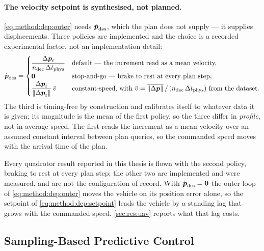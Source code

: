 \paragraph{The velocity setpoint is synthesised, not planned.} \eqref{eq:method:dep:outer} needs
$\dot{\boldsymbol{p}}_{\textrm{des}}$, which the plan does not supply --- it supplies displacements. Three
policies are implemented and the choice is a recorded experimental factor, not an implementation
detail:
\begin{equation}\label{eq:method:dep:vdes}
  \dot{\boldsymbol{p}}_{\textrm{des}} =
  \begin{cases}
    \dfrac{\Delta\boldsymbol{p}_{t}}{n_{\textrm{dec}}\,\Delta t_{\textrm{phys}}} & \text{default --- the increment read as a mean velocity,}\\
    \boldsymbol{0} & \text{stop-and-go --- brake to rest at every plan step,}\\
    \dfrac{\Delta\boldsymbol{p}_{t}}{\|\Delta\boldsymbol{p}_{t}\|}\,\bar{v} & \text{constant-speed, with }
      \bar{v} = \overline{\|\Delta\boldsymbol{p}\|}\,/\,(n_{\textrm{dec}}\,\Delta t_{\textrm{phys}})\text{ from the dataset.}
  \end{cases}
\end{equation}
The third is timing-free by construction and calibrates itself to whatever data it is given; its
magnitude is the mean of the first policy, so the three differ in \emph{profile}, not in average
speed. The first reads the increment as a mean velocity over an assumed constant interval between
plan queries, so the commanded speed moves with the arrival time of the plan.

Every quadrotor result reported in this thesis is flown with the second policy, braking to rest at
every plan step; the other two are implemented and were measured, and are not the configuration of
record. With $\dot{\boldsymbol{p}}_{\textrm{des}} = \boldsymbol{0}$ the outer loop of \eqref{eq:method:dep:outer} moves
the vehicle on its position error alone, so the setpoint of \eqref{eq:method:dep:setpoint} leads the
vehicle by a standing lag that grows with the commanded speed. \autoref{sec:res:uav} reports what
that lag costs.

\subsection{Sampling-Based Predictive Control}\label{sec:method:mjpc}

